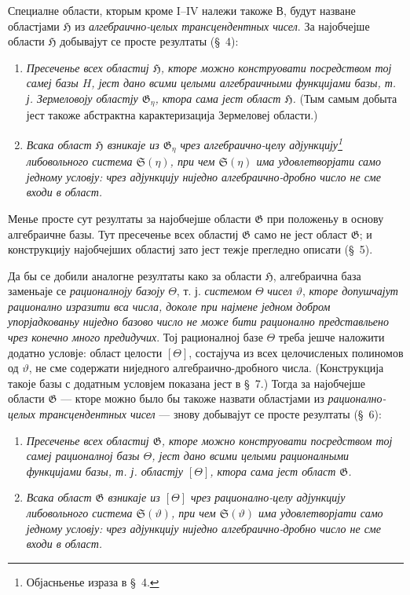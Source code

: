 ﻿\documentclass[11pt]{article}
\begin{document}
Специалне области, кторым кроме I--IV належи такоже В, будут назване областјами $\mathfrak H$ из {\itshape алгебраично-целых трансцендентных чисел}. За најобчејше области $\mathfrak H$ добывајут се просте резултаты (\S\ 4):
\begin{enumerate}
\item[а)] {\itshape Пресеченье всех областиј $\mathfrak H$, кторе можно конструовати посредством тој самеј базы $H$, јест дано всими целыми алгебраичными функцијами базы, т. ј. Зермеловоју областју $\mathfrak G_\eta$, ктора сама јест област $\mathfrak H$.} (Тым самым добыта јест такоже абстрактна карактеризација Зермеловеј области.)
\item[б)] {\itshape Всака област $\mathfrak H$ взникаје из $\mathfrak G_\eta$ чрез алгебраично-целу адјункцију\footnote{Објасньенье израза в \S\ 4.} либовольного система $\mathfrak S(\eta)$, при чем $\mathfrak S(\eta)$ има удовлетворјати само једному условју: чрез адјункцију ниједно алгебраично-дробно число не сме входи в област.}
\end{enumerate}

Менье просте сут резултаты за најобчејше области $\mathfrak G$ при положеньу в основу алгебраичне базы. Тут пресеченье всех областиј $\mathfrak G$ само не јест област $\mathfrak G$; и конструкцију најобчејших областиј зато јест тежје прегледно описати (\S\ 5).

Да бы се добили аналогне резултаты како за области $\mathfrak H$, алгебраична база заменьаје се {\itshape рационалноју базоју} $\Theta$, т. ј. {\itshape системом} $\Theta$ {\itshape чисел} $\vartheta$, {\itshape кторе допушчајут рационално изразити вса числа, доколе при најмене једном добром упорјадкованьу ниједно базово число не може бити рационално представльено чрез конечно много предидучих}. Тој рационалној базе $\Theta$ треба јешче наложити додатно условје: област целости $[\Theta]$, состајуча из всех целочисленых полиномов од $\vartheta$, не сме содержати ниједного алгебраично-дробного числа. (Конструкција такоје базы с додатным условјем показана јест в \S\ 7.) Тогда за најобчејше области $\mathfrak G$ --- кторе можно было бы такоже назвати областјами из {\itshape рационално-целых трансцендентных чисел} --- знову добывајут се просте резултаты (\S\ 6):
\begin{enumerate}
\item[а)] {\itshape Пресеченье всех областиј $\mathfrak G$, кторе можно конструовати посредством тој самеј рационалној базы $\Theta$, јест дано всими целыми рационалными функцијами базы, т. ј. областју $[\Theta]$, ктора сама јест област $\mathfrak G$.}
\item[б)] {\itshape Всака област $\mathfrak G$ взникаје из $[\Theta]$ чрез рационално-целу адјункцију либовольного система $\mathfrak S(\vartheta)$, при чем $\mathfrak S(\vartheta)$ има удовлетворјати само једному условју: чрез адјункцију ниједно алгебраично-дробно число не сме входи в област.}
\end{enumerate}
\end{document}
